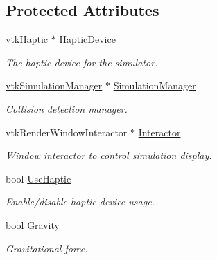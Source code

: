 \subsection*{Protected Attributes}
\begin{DoxyCompactItemize}
\item 
\hypertarget{classvtkSimulation_aa2472aa6e93b91690a35f4675e8dab43}{
\hyperlink{classvtkHaptic}{vtkHaptic} $\ast$ \hyperlink{classvtkSimulation_aa2472aa6e93b91690a35f4675e8dab43}{HapticDevice}}
\label{classvtkSimulation_aa2472aa6e93b91690a35f4675e8dab43}

\begin{DoxyCompactList}\small\item\em The haptic device for the simulator. \item\end{DoxyCompactList}\item 
\hypertarget{classvtkSimulation_ae8b90fb911d026f5ad94715073db740f}{
\hyperlink{classvtkSimulationManager}{vtkSimulationManager} $\ast$ \hyperlink{classvtkSimulation_ae8b90fb911d026f5ad94715073db740f}{SimulationManager}}
\label{classvtkSimulation_ae8b90fb911d026f5ad94715073db740f}

\begin{DoxyCompactList}\small\item\em Collision detection manager. \item\end{DoxyCompactList}\item 
\hypertarget{classvtkSimulation_a14344fc57758eb7b744abff156e0fb25}{
vtkRenderWindowInteractor $\ast$ \hyperlink{classvtkSimulation_a14344fc57758eb7b744abff156e0fb25}{Interactor}}
\label{classvtkSimulation_a14344fc57758eb7b744abff156e0fb25}

\begin{DoxyCompactList}\small\item\em Window interactor to control simulation display. \item\end{DoxyCompactList}\item 
\hypertarget{classvtkSimulation_afd9fd6366920c569515356d88d6936ee}{
bool \hyperlink{classvtkSimulation_afd9fd6366920c569515356d88d6936ee}{UseHaptic}}
\label{classvtkSimulation_afd9fd6366920c569515356d88d6936ee}

\begin{DoxyCompactList}\small\item\em Enable/disable haptic device usage. \item\end{DoxyCompactList}\item 
\hypertarget{classvtkSimulation_ab929b00c51358d4226abc8914f7e32e1}{
bool \hyperlink{classvtkSimulation_ab929b00c51358d4226abc8914f7e32e1}{Gravity}}
\label{classvtkSimulation_ab929b00c51358d4226abc8914f7e32e1}

\begin{DoxyCompactList}\small\item\em Gravitational force. \item\end{DoxyCompactList}\end{DoxyCompactItemize}


